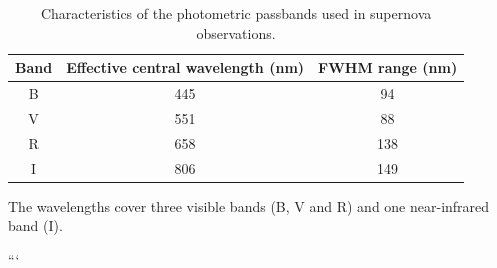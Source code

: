 \begin{table}
\centering
\begin{threeparttable}
\caption{Characteristics of the photometric passbands used in supernova observations.}
\label{tab:C.1}

\begin{tabular}{ccc}
\toprule
Band &
Effective central wavelength (nm) &
FWHM range (nm) \\
\midrule
B & 445 & 94 \\
V & 551 & 88 \\
R & 658 & 138 \\
I & 806 & 149 \\
\bottomrule
\end{tabular}

\begin{tablenotes}
\small
\item The wavelengths cover three visible bands (B, V and R) and one near-infrared band (I).
\end{tablenotes}

\end{threeparttable}
\end{table}
```
